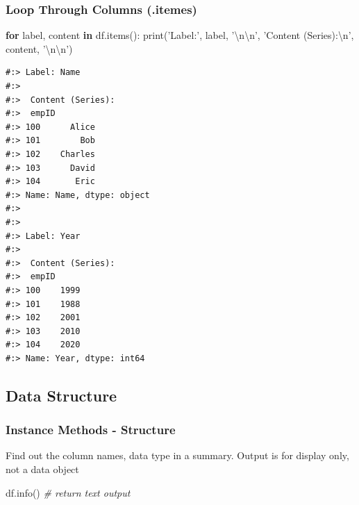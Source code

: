 \documentclass[
]{book}
\newenvironment{Shaded}{\begin{snugshade}}{\end{snugshade}}
\newcommand{\BuiltInTok}[1]{#1}
\newcommand{\CharTok}[1]{\textcolor[rgb]{0.5,0.5,0.5}{#1}}
\newcommand{\CommentTok}[1]{\textcolor[rgb]{0.37,0.37,0.37}{\textit{#1}}}
\newcommand{\ControlFlowTok}[1]{\textcolor[rgb]{0.27,0.27,0.27}{\textbf{#1}}}
\newcommand{\KeywordTok}[1]{\textcolor[rgb]{0.27,0.27,0.27}{\textbf{#1}}}
\newcommand{\NormalTok}[1]{#1}
\newcommand{\StringTok}[1]{\textcolor[rgb]{0.5,0.5,0.5}{#1}}
\begin{document}
\hypertarget{loop-through-columns-.itemes}{%
\subsubsection{Loop Through Columns (.itemes)}\label{loop-through-columns-.itemes}}

\begin{Shaded}
\begin{Highlighting}[]
\ControlFlowTok{for}\NormalTok{ label, content }\KeywordTok{in}\NormalTok{ df.items():}
  \BuiltInTok{print}\NormalTok{(}\StringTok{'Label:'}\NormalTok{,            label,   }\StringTok{'}\CharTok{\textbackslash{}n\textbackslash{}n}\StringTok{'}\NormalTok{, }
        \StringTok{'Content (Series):}\CharTok{\textbackslash{}n}\StringTok{'}\NormalTok{, content, }\StringTok{'}\CharTok{\textbackslash{}n\textbackslash{}n}\StringTok{'}\NormalTok{)}
\end{Highlighting}
\end{Shaded}

\begin{verbatim}
#:> Label: Name 
#:> 
#:>  Content (Series):
#:>  empID
#:> 100      Alice
#:> 101        Bob
#:> 102    Charles
#:> 103      David
#:> 104       Eric
#:> Name: Name, dtype: object 
#:> 
#:> 
#:> Label: Year 
#:> 
#:>  Content (Series):
#:>  empID
#:> 100    1999
#:> 101    1988
#:> 102    2001
#:> 103    2010
#:> 104    2020
#:> Name: Year, dtype: int64
\end{verbatim}

\hypertarget{data-structure}{%
\subsection{Data Structure}\label{data-structure}}

\hypertarget{instance-methods---structure}{%
\subsubsection{Instance Methods - Structure}\label{instance-methods---structure}}

Find out the column names, data type in a summary. Output is for display only, not a data object

\begin{Shaded}
\begin{Highlighting}[]
\NormalTok{df.info()  }\CommentTok{# return text output}
\end{Highlighting}
\end{Shaded}
\end{document}
